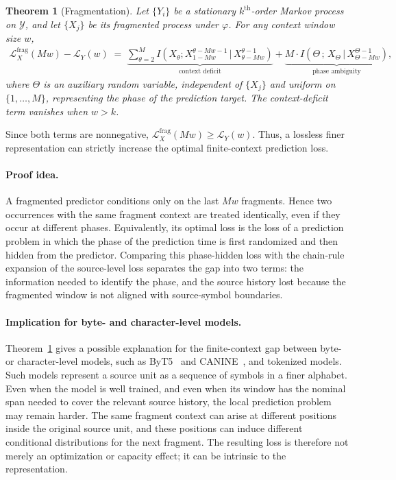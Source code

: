 \documentclass{article}
\theoremstyle{plain}
\newtheorem{theorem}{Theorem}[section]
\theoremstyle{definition}
\theoremstyle{remark}
\begin{document}
    \begin{mainthmbox}
    \begin{theorem}[Fragmentation]\label{thm:fragmentation}
    Let $\{Y_i\}$ be a stationary $k^{\text{th}}$-order Markov process on $\mathcal{Y}$, and let $\{X_j\}$ be its fragmented process under $\varphi$. For any context window size $w$,
    \begin{align}\label{eq:fragmentation-theorem}
    \mathcal{L}_X^{\mathrm{frag}}(Mw) - \mathcal{L}_Y(w)
    \;=\; \underbrace{\sum_{\theta = 2}^{M} I\!\left(X_{\theta}; X_{1-Mw}^{\theta-Mw - 1} \,\big|\, X_{\theta-Mw}^{\theta-1}\right)}_{\text{context deficit}} \nonumber  + \underbrace{M \cdot I\!\left(\Theta \,;\, X_{\Theta} \,\big|\, X_{\Theta-Mw}^{\Theta-1}\right)}_{\text{phase ambiguity}},
    \end{align}
   where $\Theta$ is an auxiliary random variable, independent of $\{X_j\}$ and
uniform on $\{1,\ldots,M\}$, representing the phase of the prediction target.
The context-deficit term vanishes when $w>k$.
    \end{theorem}
    \end{mainthmbox}
    Since both terms are nonnegative,
    $
        \mathcal{L}_X^{\mathrm{frag}}(Mw)
        \ge
        \mathcal{L}_Y(w).
    $
    Thus, a lossless finer representation can strictly increase the optimal
    finite-context prediction loss.
    
    \paragraph{Proof idea.}
A fragmented predictor conditions only on the last $Mw$ fragments.  Hence
two occurrences with the same fragment context are treated identically, even
if they occur at different phases.  Equivalently, its optimal loss is the
loss of a prediction problem in which the phase of the prediction time is
first randomized and then hidden from the predictor.  Comparing this
phase-hidden loss with the chain-rule expansion of the source-level loss
separates the gap into two terms: the information needed to identify the
phase, and the source history lost because the fragmented window is not
aligned with source-symbol boundaries.
    
    \paragraph{Implication for byte- and character-level models.}
Theorem~\ref{thm:fragmentation} gives a possible explanation for the
finite-context gap between byte- or character-level models, such as
ByT5~\citep{xueByT5TokenFreeFuture2022} and
CANINE~\citep{clarkCaninePretrainingEfficient2022}, and tokenized models.
Such models represent a source unit as a sequence of symbols in a finer
alphabet.  Even when the model is well trained, and even when its window has
the nominal span needed to cover the relevant source history, the local
prediction problem may remain harder.  The same fragment context can arise
at different positions inside the original source unit, and these positions
can induce different conditional distributions for the next fragment.  The
resulting loss is therefore not merely an optimization or capacity effect;
it can be intrinsic to the representation.
\end{document}
